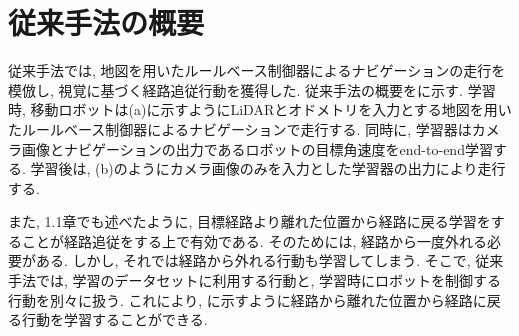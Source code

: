 
\section{従来手法の概要}
従来手法\cite{okada-si2020}では, 地図を用いたルールベース制御器によるナビゲーションの走行を模倣し, 視覚に基づく経路追従行動を獲得した. 従来手法の概要をに示す. 学習時, 移動ロボットは(a)に示すようにLiDARとオドメトリを入力とする地図を用いたルールベース制御器によるナビゲーションで走行する. 同時に, 学習器はカメラ画像とナビゲーションの出力であるロボットの目標角速度をend-to-end学習する. 学習後は, (b)のようにカメラ画像のみを入力とした学習器の出力により走行する. \par また, 1.1章でも述べたように, 目標経路より離れた位置から経路に戻る学習をすることが経路追従をする上で有効である. そのためには, 経路から一度外れる必要がある. しかし, それでは経路から外れる行動も学習してしまう. そこで, 従来手法では, 学習のデータセットに利用する行動と, 学習時にロボットを制御する行動を別々に扱う. これにより, に示すように経路から離れた位置から経路に戻る行動を学習することができる. 

